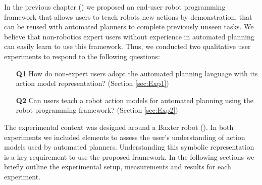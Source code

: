 
\label{sec:hypotheses}

In the previous chapter () we proposed an end-user robot programming framework that allows users to teach robots new actions by demonstration, that can be reused with automated planners to complete previously unseen tasks.
We believe that non-robotics expert users without experience in automated planning can easily learn to use this framework.
Thus, %
we conducted two qualitative user experiments to respond to the following questions:
\begin{enumerate}
  \item[\textbf{Q1}] How do non-expert users adopt the automated planning language with its action model representation? (Section \ref{sec:Exp1})
  \item[\textbf{Q2}] Can users teach a robot action models for automated planning using the robot programming framework? (Section \ref{sec:Exp2})
\end{enumerate}

The experimental context was designed around a Baxter robot ().
In both experiments we included elements to assess the user's understanding of action models used by automated planners.
Understanding this symbolic representation is a key requirement to use the proposed framework.
In the following sections we briefly outline the experimental setup, measurements and results for each experiment.
 
